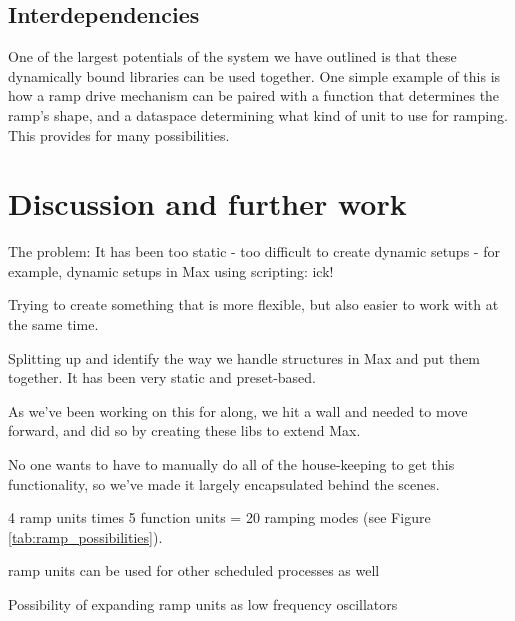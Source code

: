 \documentclass{article}
\begin{document}

\subsection{Interdependencies}\label{sec:interdependencies}

One of the largest potentials of the system we have outlined is that these dynamically bound libraries can be used together. One simple example of this is how a ramp drive mechanism can be paired with a function that determines the ramp's shape, and a dataspace determining what kind of unit to use for ramping.  This provides for many possibilities.




\section{Discussion and further work} %
\label{sec:discussion_and_further_work}

The problem: 
It has been too static
    - too difficult to create dynamic setups
    - for example, dynamic setups in Max using scripting: ick!

Trying to create something that is more flexible, but also easier to work with at the same time.

Splitting up and identify the way we handle structures in Max and put them together.  It has been very static and preset-based.

As we've been working on this for along, we hit a wall and needed to move forward, and did so by creating these libs to extend Max.  

No one wants to have to manually do all of the house-keeping to get this functionality, so we've made it largely encapsulated behind the scenes.


4 ramp units times 5 function units = 20 ramping modes (see Figure \ref{tab:ramp_possibilities}).

ramp units can be used for other scheduled processes as well

Possibility of expanding ramp units as low frequency oscillators
\end{document}
